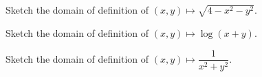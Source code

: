 \section*{}
\begin{multicols}{2}\columnseprule 1pt \columnsep 25pt
\begin{problem}
Sketch the domain of definition of $(x,y)\mapsto \sqrt{4-x^2-y^2}$.
\end{problem}
\begin{problem}
Sketch the domain of definition of $(x,y)\mapsto \log (x+y)$.
\end{problem}
\begin{problem}
Sketch the domain of definition of $(x,y)\mapsto
\dfrac{1}{x^2+y^2}$.
\end{problem}


\end{multicols}
